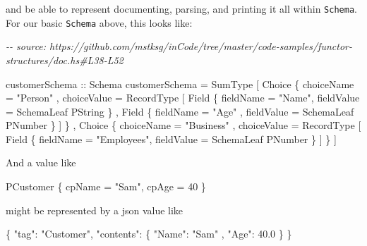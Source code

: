\documentclass[]{article}
\newenvironment{Shaded}{}{}
\newcommand{\CommentTok}[1]{\textcolor[rgb]{0.38,0.63,0.69}{\textit{#1}}}
\newcommand{\DataTypeTok}[1]{\textcolor[rgb]{0.56,0.13,0.00}{#1}}
\newcommand{\DecValTok}[1]{\textcolor[rgb]{0.25,0.63,0.44}{#1}}
\newcommand{\FloatTok}[1]{\textcolor[rgb]{0.25,0.63,0.44}{#1}}
\newcommand{\FunctionTok}[1]{\textcolor[rgb]{0.02,0.16,0.49}{#1}}
\newcommand{\NormalTok}[1]{#1}
\newcommand{\OtherTok}[1]{\textcolor[rgb]{0.00,0.44,0.13}{#1}}
\newcommand{\StringTok}[1]{\textcolor[rgb]{0.25,0.44,0.63}{#1}}
\begin{document}
and be able to represent documenting, parsing, and printing it all within
\texttt{Schema}. For our basic \texttt{Schema} above, this looks like:

\begin{Shaded}
\begin{Highlighting}[]
\CommentTok{{-}{-} source: https://github.com/mstksg/inCode/tree/master/code{-}samples/functor{-}structures/doc.hs\#L38{-}L52}

\OtherTok{customerSchema ::} \DataTypeTok{Schema}
\NormalTok{customerSchema }\OtherTok{=} \DataTypeTok{SumType}
\NormalTok{    [ }\DataTypeTok{Choice}
\NormalTok{        \{ choiceName  }\OtherTok{=} \StringTok{"Person"}
\NormalTok{        , choiceValue }\OtherTok{=} \DataTypeTok{RecordType}
\NormalTok{            [ }\DataTypeTok{Field}\NormalTok{ \{ fieldName }\OtherTok{=} \StringTok{"Name"}\NormalTok{, fieldValue }\OtherTok{=} \DataTypeTok{SchemaLeaf} \DataTypeTok{PString}\NormalTok{ \}}
\NormalTok{            , }\DataTypeTok{Field}\NormalTok{ \{ fieldName }\OtherTok{=} \StringTok{"Age"}\NormalTok{ , fieldValue }\OtherTok{=} \DataTypeTok{SchemaLeaf} \DataTypeTok{PNumber}\NormalTok{ \}}
\NormalTok{            ]}
\NormalTok{        \}}
\NormalTok{    , }\DataTypeTok{Choice}
\NormalTok{        \{ choiceName  }\OtherTok{=} \StringTok{"Business"}
\NormalTok{        , choiceValue }\OtherTok{=} \DataTypeTok{RecordType}
\NormalTok{            [ }\DataTypeTok{Field}\NormalTok{ \{ fieldName }\OtherTok{=} \StringTok{"Employees"}\NormalTok{, fieldValue }\OtherTok{=} \DataTypeTok{SchemaLeaf} \DataTypeTok{PNumber}\NormalTok{ \} ]}
\NormalTok{        \}}
\NormalTok{    ]}
\end{Highlighting}
\end{Shaded}

And a value like

\begin{Shaded}
\begin{Highlighting}[]
\DataTypeTok{PCustomer}\NormalTok{ \{ cpName }\OtherTok{=} \StringTok{"Sam"}\NormalTok{, cpAge }\OtherTok{=} \DecValTok{40}\NormalTok{ \}}
\end{Highlighting}
\end{Shaded}

might be represented by a json value like

\begin{Shaded}
\begin{Highlighting}[]
\FunctionTok{\{} \DataTypeTok{"tag"}\FunctionTok{:} \StringTok{"Customer"}\FunctionTok{,}
  \DataTypeTok{"contents"}\FunctionTok{:}
    \FunctionTok{\{} \DataTypeTok{"Name"}\FunctionTok{:} \StringTok{"Sam"}
    \FunctionTok{,} \DataTypeTok{"Age"}\FunctionTok{:} \FloatTok{40.0}
    \FunctionTok{\}}
\FunctionTok{\}}
\end{Highlighting}
\end{Shaded}
\end{document}
